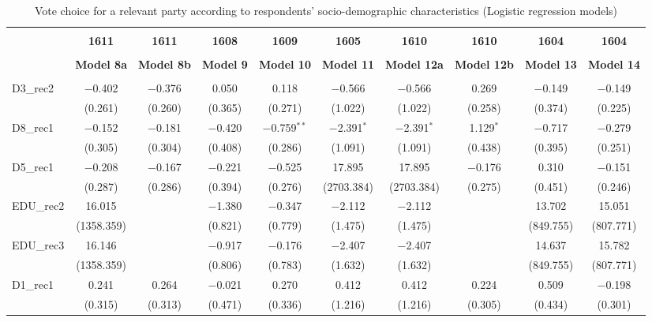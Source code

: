 \documentclass[
]{article}
\begin{document}
\begin{table}[!htbp] \centering 
  \caption{Vote choice for a relevant party according to respondents'
                       socio-demographic characteristics (Logistic regression models)} 
  \label{table:full_logit_lv_p1} 
\begin{tabular}{@{\extracolsep{0.5pt}}lccccccccc} 
\\[-1.8ex]\hline \\[-1.8ex] 
 & \textbf{1611} & \textbf{1611} & \textbf{1608} & \textbf{1609} & \textbf{1605} & \textbf{1610} & \textbf{1610} & \textbf{1604} & \textbf{1604} \\ 
\\[-1.8ex] & \textbf{Model 8a} & \textbf{Model 8b} & \textbf{Model 9} & \textbf{Model 10} & \textbf{Model 11} & \textbf{Model 12a} & \textbf{Model 12b} & \textbf{Model 13} & \textbf{Model 14}\\ 
\hline \\[-1.8ex] 
 D3\_rec2 & $-$0.402 & $-$0.376 & 0.050 & 0.118 & $-$0.566 & $-$0.566 & 0.269 & $-$0.149 & $-$0.149 \\ 
  & (0.261) & (0.260) & (0.365) & (0.271) & (1.022) & (1.022) & (0.258) & (0.374) & (0.225) \\ 
  D8\_rec1 & $-$0.152 & $-$0.181 & $-$0.420 & $-$0.759$^{**}$ & $-$2.391$^{*}$ & $-$2.391$^{*}$ & 1.129$^{*}$ & $-$0.717 & $-$0.279 \\ 
  & (0.305) & (0.304) & (0.408) & (0.286) & (1.091) & (1.091) & (0.438) & (0.395) & (0.251) \\ 
  D5\_rec1 & $-$0.208 & $-$0.167 & $-$0.221 & $-$0.525 & 17.895 & 17.895 & $-$0.176 & 0.310 & $-$0.151 \\ 
  & (0.287) & (0.286) & (0.394) & (0.276) & (2703.384) & (2703.384) & (0.275) & (0.451) & (0.246) \\ 
  EDU\_rec2 & 16.015 &  & $-$1.380 & $-$0.347 & $-$2.112 & $-$2.112 &  & 13.702 & 15.051 \\ 
  & (1358.359) &  & (0.821) & (0.779) & (1.475) & (1.475) &  & (849.755) & (807.771) \\ 
  EDU\_rec3 & 16.146 &  & $-$0.917 & $-$0.176 & $-$2.407 & $-$2.407 &  & 14.637 & 15.782 \\ 
  & (1358.359) &  & (0.806) & (0.783) & (1.632) & (1.632) &  & (849.755) & (807.771) \\ 
  D1\_rec1 & 0.241 & 0.264 & $-$0.021 & 0.270 & 0.412 & 0.412 & 0.224 & 0.509 & $-$0.198 \\ 
  & (0.315) & (0.313) & (0.471) & (0.336) & (1.216) & (1.216) & (0.305) & (0.434) & (0.301) \\ 

\end{tabular}
\end{table}
\end{document}

